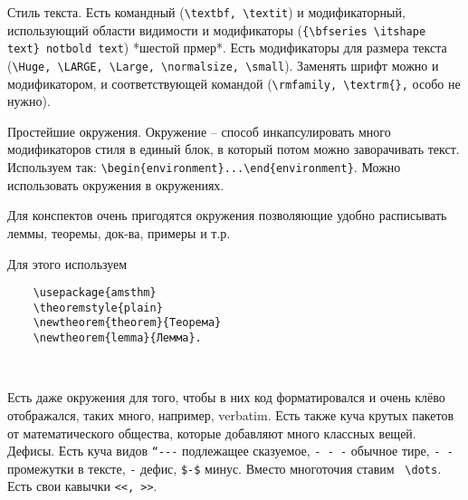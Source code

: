 \documentclass[a4paper, 12pt]{article}
\begin{document}
Стиль текста. Есть командный (\verb|\textbf, \textit|) и модификаторный, использующий области видимости и модификаторы (\verb|{\bfseries \itshape text} notbold text|) *шестой прмер*. Есть модификаторы для размера текста (\verb|\Huge, \LARGE, \Large, \normalsize, \small|). Заменять шрифт можно и модификатором, и соответствующей командой (\verb|\rmfamily, \textrm{},| особо не нужно).

Простейшие окружения. Окружение – способ инкапсулировать много модификаторов стиля в единый блок, в который потом можно заворачивать текст. Используем так: \verb|\begin{environment}...\end{environment}|. Можно использовать окружения в окружениях. 

Для конспектов очень пригодятся окружения позволяющие удобно расписывать леммы, теоремы, док-ва, примеры и т.р.

Для этого используем
\begin{verbatim}
	\usepackage{amsthm}
	\theoremstyle{plain}
	\newtheorem{theorem}{Теорема}
	\newtheorem{lemma}{Лемма}.
\end{verbatim} 

Есть даже окружения для того, чтобы в них код форматировался и очень клёво отображался, таких много, например, verbatim.
Есть также куча крутых пакетов от математического общества, которые добавляют много классных вещей. 
Дефисы. Есть куча видов \verb|“---| подлежащее сказуемое, \verb|- - -| обычное тире, \verb|- -| промежутки в тексте, \verb|-| дефис, \verb|$-$| минус.
Вместо многоточия ставим  \verb|\dots|. Есть свои кавычки \verb|<<, >>|.
\end{document}
